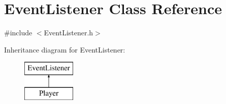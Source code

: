 \hypertarget{class_event_listener}{}\section{Event\+Listener Class Reference}
\label{class_event_listener}


{\ttfamily \#include $<$Event\+Listener.\+h$>$}

Inheritance diagram for Event\+Listener\+:\begin{figure}[H]
\begin{center}
\leavevmode
\includegraphics[height=2.000000cm]{class_event_listener}
\end{center}
\end{figure}
